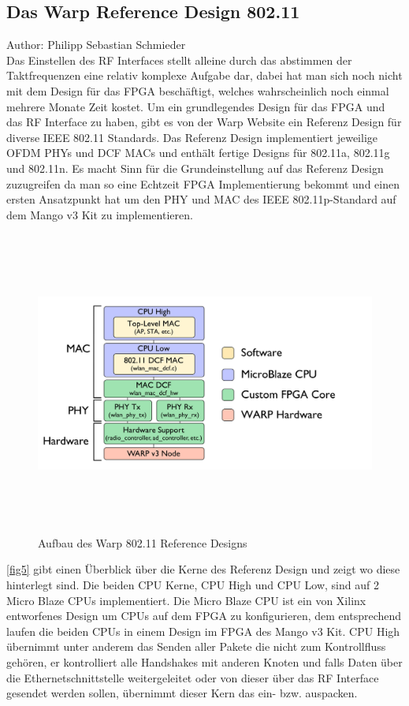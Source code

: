 \documentclass[letterpaper,11pt,ngerman]{article}
\begin{document}
\begin{onehalfspace}
\section{Das Warp Reference Design 802.11}
\label{sc:802.11rd}
\small Author: Philipp Sebastian Schmieder\\
\Large
Das Einstellen des RF Interfaces stellt alleine durch das abstimmen der Taktfrequenzen eine relativ komplexe Aufgabe dar, dabei hat man sich noch nicht mit dem Design für das FPGA beschäftigt, welches wahrscheinlich noch einmal mehrere Monate Zeit kostet. Um ein grundlegendes Design für das FPGA und das RF Interface zu haben, gibt es von der Warp Website ein Referenz Design für diverse IEEE 802.11 Standards. Das Referenz Design implementiert jeweilige OFDM PHYs und DCF MACs und enthält fertige Designs für  802.11a, 802.11g und 802.11n. Es macht Sinn für die Grundeinstellung auf das Referenz Design zuzugreifen da man so eine Echtzeit FPGA Implementierung bekommt und einen ersten Ansatzpunkt hat um den PHY und MAC des IEEE 802.11p-Standard auf dem Mango v3 Kit zu implementieren.
\begin{figure}[H]
\begin{center}
\includegraphics[width = 16cm,height=10cm]{Archreferencedesign.png}
\caption{Aufbau des Warp 802.11 Reference Designs  \cite{[5]}}
\label{fig5}
\end{center}
\end{figure}
\noindent \autoref{fig5} gibt einen Überblick über die Kerne des Referenz Design und zeigt wo diese hinterlegt sind. Die beiden CPU Kerne, CPU High und CPU Low, sind auf 2 Micro Blaze CPUs implementiert. Die Micro Blaze CPU ist ein von Xilinx entworfenes Design um CPUs auf dem FPGA zu konfigurieren, dem entsprechend laufen die beiden CPUs in einem Design im FPGA des Mango v3 Kit. CPU High übernimmt unter anderem das Senden aller Pakete die nicht zum Kontrollfluss gehören, er kontrolliert alle Handshakes mit anderen Knoten und falls Daten über die Ethernetschnittstelle weitergeleitet oder von dieser über das RF Interface gesendet werden sollen, übernimmt dieser Kern das ein- bzw. auspacken.

\end{onehalfspace}
\end{document}
